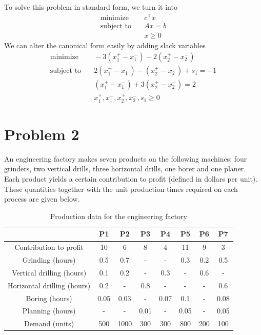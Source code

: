 \documentclass[11pt]{article}
\begin{document}
To solve this problem in standard form, we turn it into
\begin{align}
  \text{minimize} & \quad c^\top x \\
  \text{subject to} & \quad Ax = b \\
  & \quad x \geq 0
\end{align}
We can alter the canonical form easily by adding slack variables
\begin{align}
  \text{minimize} & \quad -3 (x_1^+ - x_1^-) - 2(x_2^+ - x_2^-) \\
  \text{subject to} & \quad 2(x_1^+ - x_1^-) - (x_2^+ - x_2^-) + s_1 = -1 \\
  & \quad (x_1^+ - x_1^-) + 3(x_2^+ - x_2^-) = 2 \\
  & \quad x_1^+, x_1^-, x_2^+, x_2^-, s_1 \geq 0
\end{align}

\section{Problem 2}
An engineering factory makes seven products on the following machines: four
grinders, two vertical drills, three horizontal drills, one borer and one planer. Each product
yields a certain contribution to profit (defined in dollars per unit). These quantities together
with the unit production times required on each process are given below.

\begin{table}[h!]
\centering
\begin{tabular}{|c|c|c|c|c|c|c|c|}
\hline
 & P1 & P2 & P3 & P4 & P5 & P6 & P7 \\
\hline
Contribution to profit & 10 & 6 & 8 & 4 & 11 & 9 & 3 \\
\hline
Grinding (hours) & 0.5 & 0.7 & - & - & 0.3 & 0.2 & 0.5 \\
\hline
Vertical drilling (hours) & 0.1 & 0.2 & - & 0.3 & - & 0.6 & - \\
\hline
Horizontal drilling (hours) & 0.2 & - & 0.8 & - & - & - & 0.6 \\
\hline
Boring (hours) & 0.05 & 0.03 & - & 0.07 & 0.1 & - & 0.08 \\
\hline
Planning (hours) & - & - & 0.01 & - & 0.05 & - & 0.05 \\
\hline
Demand (units) & 500 & 1000 & 300 & 300 & 800 & 200 & 100 \\
\hline
\end{tabular}
\caption{Production data for the engineering factory}
\label{tab_problem2}
\end{table}
\end{document}
